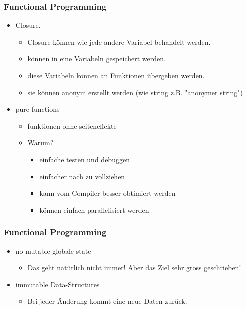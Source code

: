 \documentclass[compress, blue]{beamer}
\begin{document}
\begin{frame}\frametitle{Functional Programming}
  \begin{itemize}
  \item Closure.\pause
    \begin{itemize}
      \item Closure können wie jede andere Variabel behandelt werden.\pause
      \item können in eine Variabeln gespeichert werden.\pause
      \item diese Variabeln können an Funktionen übergeben werden.\pause
      \item sie können anonym erstellt werden (wie string
        z.B. "anonymer string") \pause
    \end{itemize}
  \end{itemize}

  \begin{itemize}
  \item pure functions \pause
    \begin{itemize}
       \item funktionen ohne  seiteneffekte \pause
       \item Warum? \pause
         \begin{itemize}
          \item einfache testen und debuggen \pause
          \item einfacher nach zu vollziehen \pause
          \item kann vom Compiler besser obtimiert werden \pause
          \item können einfach parallelisiert werden \pause
         \end{itemize}
    \end{itemize}
  \end{itemize}
\end{frame}


\begin{frame}\frametitle{Functional Programming}
  \begin{itemize}
  \item no mutable globale state \pause
    \begin{itemize}
       \item Das geht natürlich nicht immer! Aber das Ziel sehr gross
         geschrieben! \pause
    \end{itemize}
  \end{itemize}

  \begin{itemize}
  \item immutable Data-Structures \pause
    \begin{itemize}
       \item Bei jeder Änderung kommt eine neue Daten
         zurück.\pause
    \end{itemize}
  \end{itemize}
\end{frame}
\end{document}
